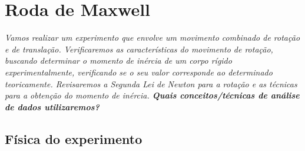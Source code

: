 \chapter{Roda de Maxwell} %
\label{Chap:RodaDeMaxwell}        %


\begin{fullwidth}\it
	Vamos realizar um experimento que envolve um movimento combinado de rotação e de translação. Verificaremos as características do movimento de rotação, buscando determinar o momento de inércia de um corpo rígido experimentalmente, verificando se o seu valor corresponde ao determinado teoricamente. Revisaremos a Segunda Lei de Newton para a rotação e as técnicas para a obtenção do momento de inércia. \textbf{Quais conceitos/técnicas de análise de dados utilizaremos?}
\end{fullwidth}

\section{Física do experimento}

